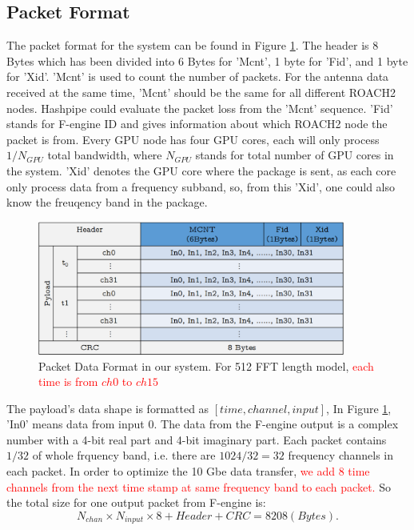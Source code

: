 \documentclass{ws-jai}
\begin{document}
\subsection{Packet Format \label{sec:Data formate}}
The packet format for the system can be found in Figure \ref{fig:data_formate}. The header is 8 Bytes which has been divided into 6 Bytes for 'Mcnt', 1 byte for 'Fid', and 1 byte for 'Xid'. 'Mcnt' is used to count the number of packets. For the antenna data received at the same  time, 'Mcnt' should be the same for all different ROACH2 nodes. Hashpipe could evaluate the packet loss from the 'Mcnt' sequence. 'Fid' stands for F-engine ID and gives information about which ROACH2 node the packet is from. Every GPU node has four GPU cores, each will only process ${1}/{N_{GPU}}$ total bandwidth, where $N_{GPU}$ stands for total number of GPU cores in the system. 
'Xid' denotes the GPU core where the package is sent, as each core only process data from a frequency subband,   so, from this 'Xid', one could also know the freuqency band  in the package.


\begin{figure}[t]
\centering
\includegraphics[width=0.9\textwidth]{./picture/Packet.eps}
\caption{Packet Data Format in our system. For 512 FFT length model, \textcolor{red}{each time is from $ch0$ to $ch15$\label{fig:data_formate}  }  }
\end{figure}

	The payload's data shape is formatted as $[time, channel, input]$, In Figure \ref{fig:data_formate}, 'In0' means data from input 0. The data from the F-engine output is a complex number with  a 4-bit real part and 4-bit imaginary part. 
        Each packet contains $1/32$ of whole frquency band, i.e. there are ${1024}/{32}=32$ frequency channels in each packet.      
        In order to optimize the 10 Gbe data transfer, \textcolor{red}{ we add 8 time channels from the next time stamp at same frequency band to each packet.}   So the total size for one output packet from F-engine is:
\begin{equation} 
N_{chan}  \times N_{input} \times 8 + Header + CRC = 8208  (Bytes) .
\end{equation}
\end{document}

